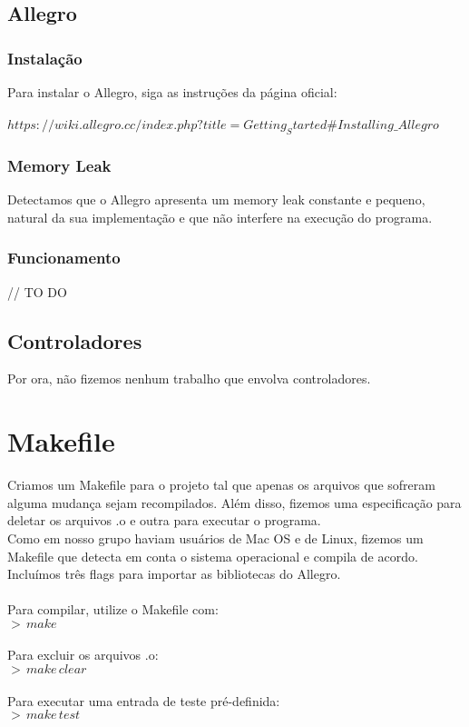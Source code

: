 \documentclass{article}
\begin{document}
\subsection{Allegro}
\subsubsection{Instalação}
Para instalar o Allegro, siga as instruções da página oficial: \\ \\
    $https://wiki.allegro.cc/index.php?title=Getting_Started\#Installing\_Allegro$

\subsubsection{Memory Leak}
Detectamos que o Allegro apresenta um memory leak constante e pequeno, natural da sua implementação e que não interfere na execução do programa.

\subsubsection{Funcionamento}
// TO DO


\subsection{Controladores}
Por ora, não fizemos nenhum trabalho que envolva controladores.

\section{Makefile}
Criamos um Makefile para o projeto tal que apenas os arquivos que sofreram alguma mudança sejam recompilados. Além disso, fizemos uma especificação para deletar os arquivos .o e outra para executar o programa. \\ 
Como em nosso grupo haviam usuários de Mac OS e de Linux, fizemos um Makefile que detecta em conta o sistema operacional e compila de acordo.\\
Incluímos três flags para importar as bibliotecas do Allegro. \\ \\
Para compilar, utilize o Makefile com: 
\\
\indent $>\,make$ \\ \\
Para excluir os arquivos .o:
\\
\indent $>\,make\,clear$ \\ \\ 
Para executar uma entrada de teste pré-definida:
\\
\indent $>\,make\,test$
\end{document}
